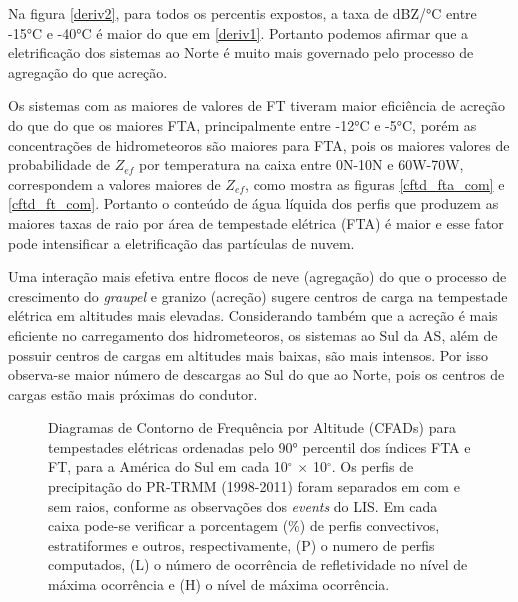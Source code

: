 Na figura \ref{deriv2}, para todos os percentis expostos, a taxa de dBZ/°C entre -15°C e -40°C é maior do que em \ref{deriv1}. Portanto podemos afirmar que a eletrificação dos sistemas ao Norte é muito mais governado pelo processo de agregação do que acreção. 

Os sistemas com as maiores de valores de FT tiveram maior eficiência de acreção do que do que os maiores FTA, principalmente entre -12°C e -5°C, porém as concentrações de hidrometeoros são maiores para FTA, pois os maiores valores de probabilidade de $Z_{ef}$ por temperatura na caixa entre 0N-10N e 60W-70W, correspondem a valores maiores de $Z_{ef}$, como mostra as figuras \ref{cftd_fta_com} e \ref{cftd_ft_com}. Portanto o conteúdo de água líquida dos perfis que produzem as maiores taxas de raio por área de tempestade elétrica (FTA) é maior e esse fator pode intensificar a eletrificação das partículas de nuvem.

Uma interação mais efetiva entre flocos de neve (agregação) do que o processo de crescimento do \textit{graupel} e granizo (acreção) sugere centros de carga na tempestade elétrica em altitudes mais elevadas. Considerando também que a acreção é mais eficiente no carregamento dos hidrometeoros, os sistemas ao Sul da AS, além de possuir centros de cargas em altitudes mais baixas, são mais intensos. Por isso observa-se maior número de descargas ao Sul do que ao Norte, pois os centros de cargas estão mais próximas do condutor.


\begin{figure}
  \caption{Diagramas de Contorno de Frequência por Altitude (CFADs) para tempestades elétricas ordenadas pelo 90° percentil dos índices FTA e FT, para a América do Sul em cada 10$^{\circ}$  $\times$ 10$^{\circ}$. Os perfis de precipitação do PR-TRMM (1998-2011) foram separados em com e sem raios, conforme as observações dos \textit{events} do LIS. Em cada caixa pode-se verificar a porcentagem (\%) de perfis convectivos, estratiformes e outros, respectivamente, (P) o numero de perfis computados, (L) o número de ocorrência de refletividade no nível de máxima ocorrência e (H) o nível de máxima ocorrência.}
\label{cfads}
\end{figure} 


